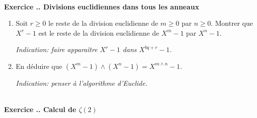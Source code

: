 \documentclass{article}
\newcounter{exo}
\newcommand{\exercice}[1][\null]{\textbf{\\ Exercice \thesection.\theexo. #1} \addtocounter{exo}{1}}
\begin{document}
\exercice[Divisions euclidiennes dans tous les anneaux]

\begin{enumerate}

\item Soit $r \ge 0$ le reste de la division euclidienne de $m\ge 0$ par $n \ge 0$. Montrer que $X^r-1$ est le reste de la division euclidienne de $X^m -1$ par $X^n -1$.

\emph{Indication: faire apparaître $X^r-1$ dans $X^{bq+r}-1$.}

\item En déduire que $(X^m -1) \wedge (X^n -1) = X^{m \wedge n}-1$.

\emph{Indication: penser à l'algorithme d'Euclide.}

\end{enumerate}

\exercice[Calcul de $\zeta(2)$]
\end{document}
